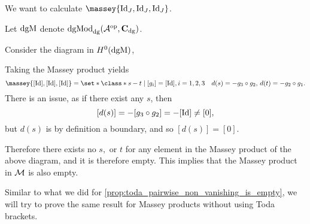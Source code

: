 \begin{example}
	We want to calculate \( \massey{\Id_J, \Id_J, \Id_J} \).

    Let \( \operatorname{dgM} \) denote \( \operatorname{dgMod}_{\operatorname{dg}}({\mathcal{A}}^{\operatorname{op}}, \operatorname{\mathbf{C}}_{\operatorname{dg}}) \).

    Consider the diagram in \( H^0(\operatorname{dgM}) \),
    \begin{center}
    \end{center}

    Taking the Massey product yields
    \[
        \massey{[\Id], [\Id], [\Id]} =
        \set*{
            \class*{
                s - t
            }
            \mid [g_i] = [\Id], i = 1, 2, 3 \quad
            d(s) = - g_3 \circ g_2, \,
            d(t) = -g_2 \circ g_1
        }.
    \]
    There is an issue, as if there exist any \( s \), then
    \[
        [d(s)] = - [g_3 \circ g_2] = - [\operatorname{Id}] \neq [0],
    \]
    but \( d(s) \) is by definition a boundary, and so \( [d(s)] = [0] \).

    Therefore there exists no \( s, \) or \( t \) for any element in the Massey product of the above diagram, and it is therefore empty. This implies that the Massey product in \( {\mathcal{M}} \) is also empty.
\end{example}

Similar to what we did for \autoref{prop:toda_pairwise_non_vanishing_is_empty}, we will try to prove the same result for Massey products without using Toda brackets.

